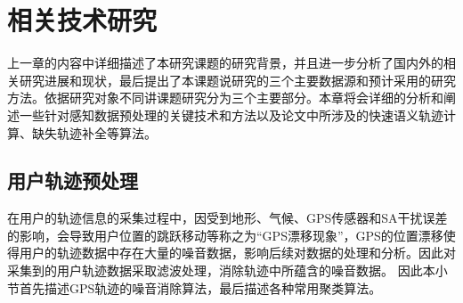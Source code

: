 \chapter{相关技术研究}
\label{chap:chapter02}
上一章的内容中详细描述了本研究课题的研究背景，并且进一步分析了国内外的相关研究进展和现状，最后提出了本课题说研究的三个主要数据源和预计采用的研究方法。依据研究对象不同讲课题研究分为三个主要部分。本章将会详细的分析和阐述一些针对感知数据预处理的关键技术和方法以及论文中所涉及的快速语义轨迹计算、缺失轨迹补全等算法。
\section{用户轨迹预处理}
\label{sec:section2-1}
在用户的轨迹信息的采集过程中，因受到地形、气候、GPS传感器和SA干扰误差的影响，会导致用户位置的跳跃移动等称之为“GPS漂移现象”，GPS的位置漂移使得用户的轨迹数据中存在大量的噪音数据，影响后续对数据的处理和分析。因此对采集到的用户轨迹数据采取滤波处理，消除轨迹中所蕴含的噪音数据。%
因此本小节首先描述GPS轨迹的噪音消除算法，最后描述各种常用聚类算法。
